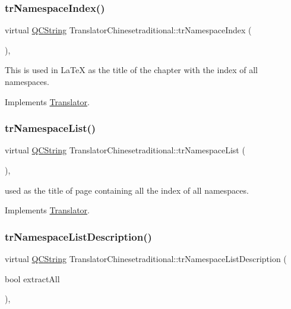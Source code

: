 \subsubsection{\texorpdfstring{trNamespaceIndex()}{trNamespaceIndex()}}
{\footnotesize\ttfamily virtual \mbox{\hyperlink{class_q_c_string}{Q\+C\+String}} Translator\+Chinesetraditional\+::tr\+Namespace\+Index (\begin{DoxyParamCaption}{ }\end{DoxyParamCaption})\hspace{0.3cm}{\ttfamily [inline]}, {\ttfamily [virtual]}}

This is used in La\+TeX as the title of the chapter with the index of all namespaces. 

Implements \mbox{\hyperlink{class_translator}{Translator}}.

\mbox{\label{class_translator_chinesetraditional_a6035de5fac1c09cffbad24fbb359791c}} 
\subsubsection{\texorpdfstring{trNamespaceList()}{trNamespaceList()}}
{\footnotesize\ttfamily virtual \mbox{\hyperlink{class_q_c_string}{Q\+C\+String}} Translator\+Chinesetraditional\+::tr\+Namespace\+List (\begin{DoxyParamCaption}{ }\end{DoxyParamCaption})\hspace{0.3cm}{\ttfamily [inline]}, {\ttfamily [virtual]}}

used as the title of page containing all the index of all namespaces. 

Implements \mbox{\hyperlink{class_translator}{Translator}}.

\mbox{\label{class_translator_chinesetraditional_a5b8b57ddcb0596a4a01b750ee003fdab}} 
\subsubsection{\texorpdfstring{trNamespaceListDescription()}{trNamespaceListDescription()}}
{\footnotesize\ttfamily virtual \mbox{\hyperlink{class_q_c_string}{Q\+C\+String}} Translator\+Chinesetraditional\+::tr\+Namespace\+List\+Description (\begin{DoxyParamCaption}\item[{bool}]{extract\+All }\end{DoxyParamCaption})\hspace{0.3cm}{\ttfamily [inline]}, {\ttfamily [virtual]}}

